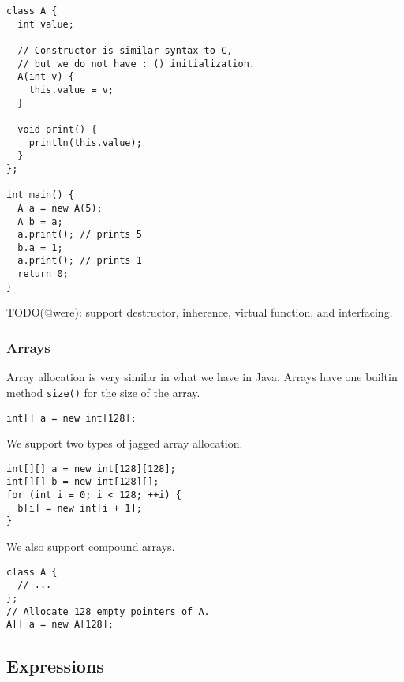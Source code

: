\documentclass{article}
\begin{document}
\begin{lstlisting}[caption=Class definition,label=code:class]
class A {
  int value;

  // Constructor is similar syntax to C,
  // but we do not have : () initialization.
  A(int v) {
    this.value = v;
  }

  void print() {
    println(this.value);
  }
};

int main() {
  A a = new A(5);
  A b = a;
  a.print(); // prints 5
  b.a = 1;
  a.print(); // prints 1
  return 0;
}
\end{lstlisting}

TODO(@were): support destructor, inherence, virtual function, and interfacing.

\subsubsection{Arrays}

Array allocation is very similar in what we have in Java.
Arrays have one builtin method \texttt{size()} for the size of the array.

\begin{lstlisting}[caption=1-D Array Allocation]
int[] a = new int[128];
\end{lstlisting}

We support two types of jagged array allocation.
\begin{lstlisting}[caption=1-D Array Allocation]
int[][] a = new int[128][128];
int[][] b = new int[128][];
for (int i = 0; i < 128; ++i) {
  b[i] = new int[i + 1];
}
\end{lstlisting}

We also support compound arrays.
\begin{lstlisting}[caption=1-D Array Allocation]
class A {
  // ...
};
// Allocate 128 empty pointers of A.
A[] a = new A[128];
\end{lstlisting}

\subsection{Expressions}
\end{document}
